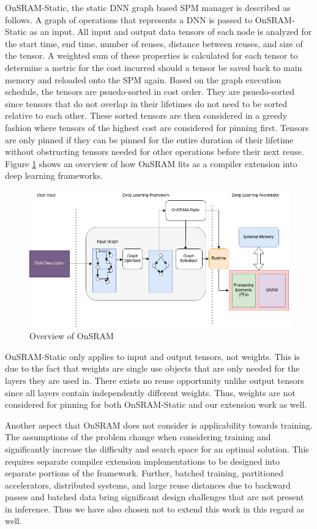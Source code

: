 OnSRAM-Static, the static DNN graph based SPM manager is described as follows.
A graph of operations that represents a DNN is passed to OnSRAM-Static as an
input. All input and output data tensors of each node is analyzed for the start
time, end time, number of reuses, distance between reuses, and size of the
tensor. A weighted sum of these properties is calculated for each tensor to
determine a metric for the cost incurred should a tensor be saved back to main
memory and reloaded onto the SPM again. Based on the graph execution schedule,
the tensors are psuedo-sorted in cost order. They are psuedo-sorted since
tensors that do not overlap in their lifetimes do not need to be sorted relative to
each other. These sorted tensors are then considered in a greedy fashion where
tensors of the highest cost are considered for pinning first. Tensors are only
pinned if they can be pinned for the entire duration of their lifetime without
obstructing tensors needed for other operations before their next reuse. Figure
\ref{fig:onsram_stack} shows an overview of how OnSRAM fits as a compiler extension
into deep learning frameworks.

\begin{figure}[thb]
\centering
\includegraphics[scale=0.5]{Figures/onsram_stack.png}
\decoRule
\caption[onsramStack]{Overview of OnSRAM}
\label{fig:onsram_stack}
\end{figure}


OnSRAM-Static only applies to input and output tensors, not weights. This is
due to the fact that weights are single use objects that are only needed for
the layers they are used in. There exists no reuse opportunity unlike output
tensors since all layers contain independently different weights. Thus, weights
are not considered for pinning for both OnSRAM-Static and our extension work as
well.

Another aspect that OnSRAM does not consider is applicability towards training.
The assumptions of the problem change when considering training and
significantly increase the difficulty and search space for an optimal solution.
This requires separate compiler extension implementations to be designed into
separate portions of the framework. Further, batched training, partitioned
accelerators, distributed systems, and large reuse distances due to backward
passes and batched data \cite{onsram} bring significant design challenges that
are not present in inference. Thus we have also chosen not to extend this work
in this regard as well.



